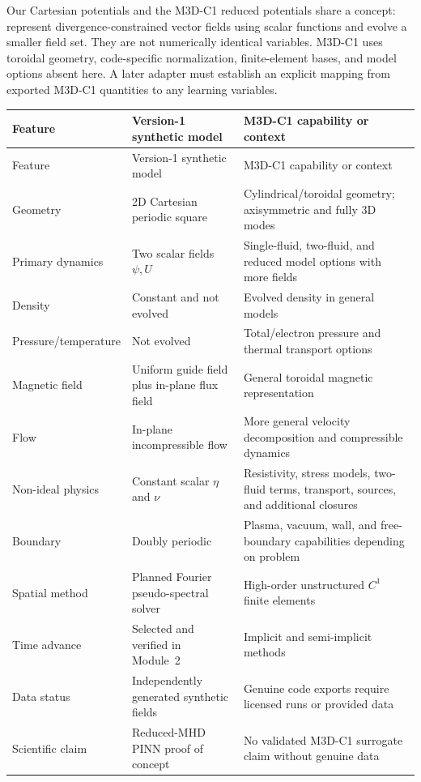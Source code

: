 \documentclass[11pt]{article}
\begin{document}
Our Cartesian potentials and the M3D-C1 reduced potentials share a concept: represent divergence-constrained vector fields using scalar functions and evolve a smaller field set. They are not numerically identical variables. M3D-C1 uses toroidal geometry, code-specific normalization, finite-element bases, and model options absent here. A later adapter must establish an explicit mapping from exported M3D-C1 quantities to any learning variables.

\begin{longtable}{p{}p{}p{}}
\toprule
Feature & Version-1 synthetic model & M3D-C1 capability or context \\
\midrule
\endfirsthead
\toprule
Feature & Version-1 synthetic model & M3D-C1 capability or context \\
\midrule
\endhead
Geometry & 2D Cartesian periodic square & Cylindrical/toroidal geometry; axisymmetric and fully 3D modes \\
Primary dynamics & Two scalar fields $\psi,U$ & Single-fluid, two-fluid, and reduced model options with more fields \\
Density & Constant and not evolved & Evolved density in general models \\
Pressure/temperature & Not evolved & Total/electron pressure and thermal transport options \\
Magnetic field & Uniform guide field plus in-plane flux field & General toroidal magnetic representation \\
Flow & In-plane incompressible flow & More general velocity decomposition and compressible dynamics \\
Non-ideal physics & Constant scalar $\eta$ and $\nu$ & Resistivity, stress models, two-fluid terms, transport, sources, and additional closures \\
Boundary & Doubly periodic & Plasma, vacuum, wall, and free-boundary capabilities depending on problem \\
Spatial method & Planned Fourier pseudo-spectral solver & High-order unstructured $C^1$ finite elements \\
Time advance & Selected and verified in Module~2 & Implicit and semi-implicit methods \\
Data status & Independently generated synthetic fields & Genuine code exports require licensed runs or provided data \\
Scientific claim & Reduced-MHD PINN proof of concept & No validated M3D-C1 surrogate claim without genuine data \\
\bottomrule
\end{longtable}
\end{document}
